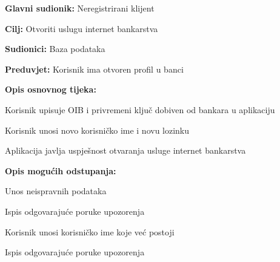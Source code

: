   				\noindent {}
  			\begin{packed_item}
  				
  				\item \textbf{Glavni sudionik: } Neregistrirani klijent
  				\item  \textbf{Cilj:} Otvoriti uslugu internet bankarstva
  				\item  \textbf{Sudionici:} Baza podataka
  				\item  \textbf{Preduvjet:} Korisnik ima otvoren profil u banci
  				\item  \textbf{Opis osnovnog tijeka:}
  				
  				\item[] \begin{packed_enum}
			
			\item Korisnik upisuje OIB i privremeni ključ dobiven od bankara u aplikaciju
			\item Korisnik unosi novo korisničko ime i novu lozinku
			\item Aplikacija javlja uspješnost otvaranja usluge internet bankarstva
			
		\end{packed_enum}
			
				\item  \textbf{Opis mogućih odstupanja:}
			
			\item[] \begin{packed_item}
				
				\item[1.a] Unos neispravnih podataka
				\item[] \begin{packed_enum}
					\item Ispis odgovarajuće poruke upozorenja
				\end{packed_enum}
				
				\item[2.a] Korisnik unosi korisničko ime koje već postoji
				\item[] \begin{packed_enum}
					\item Ispis odgovarajuće poruke upozorenja
				\end{packed_enum}
			
			\end{packed_item}
		
								
		
	\end{packed_item}		

